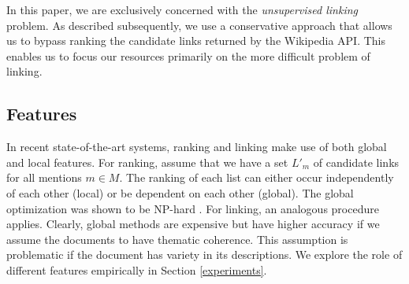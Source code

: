 In this paper, we are exclusively concerned with the \emph{unsupervised linking} problem. As described subsequently, we use a conservative approach that allows us to bypass ranking the candidate links returned by the Wikipedia API. This enables us to focus our resources primarily on the more difficult problem of linking. 
\subsection{Features}
In recent state-of-the-art systems, ranking and linking make use of both global and local features. For ranking, assume that we have a set $L'_m$ of candidate links for all mentions $m \in M$. The ranking of each list can either occur independently of each other (local) or be dependent on each other (global). The global optimization was shown to be NP-hard \cite{roth}. For linking, an analogous procedure applies. Clearly, global methods are expensive but have higher accuracy if we assume the documents to have thematic coherence. This assumption is problematic if the document has variety in its descriptions. We explore the role of different features empirically in Section \ref{experiments}.